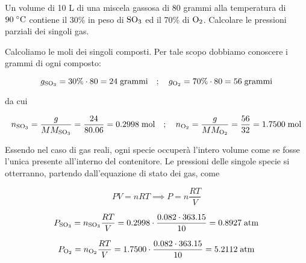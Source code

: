 \begin{esercizio}
    Un volume di 10 L di una miscela gassosa di 80 grammi alla temperatura di $90 \; ^{\circ} \rm C$ contiene il 30\% in peso di $\rm SO_3$ ed il 70\% di $\rm O_2$. Calcolare le pressioni parziali dei singoli gas.
\end{esercizio}
\begin{soluzione}
    Calcoliamo le moli dei singoli composti. Per tale scopo dobbiamo conoscere i grammi di ogni composto:

$$g_{\rm SO_3}=30\% \cdot 80=24 \; \text{grammi}
\quad;\quad
g_{\rm O_2}=70\% \cdot 80=56 \; \text{grammi}$$

da cui

\vspace{-0.2cm}$$n_{\rm SO_3}=\frac{g}{MM_{\rm SO_3}}=\frac{24}{80.06}=0.2998 \; \text{mol}
\quad;\quad
n_{\rm O_2}=\frac{g}{MM_{\rm O_2}}=\frac{56}{32}=1.7500 \; \text{mol}$$

Essendo nel caso di gas reali, ogni specie occuperà l'intero volume come se fosse l'unica presente all'interno del contenitore. Le pressioni delle singole specie si otterranno, partendo dall'equazione di stato dei gas, come

$$PV=nRT \implies
P=n\frac{RT}{V}$$

$$P_{\rm SO_3}=n_{\rm SO_3} \displaystyle \frac{RT}{V}
=0.2998 \cdot \frac{0.082 \cdot 363.15}{10}
=0.8927 \; \rm atm$$

$$P_{\rm O_2}=n_{\rm O_2} \displaystyle \frac{RT}{V}
=1.7500 \cdot \frac{0.082 \cdot 363.15}{10}
=5.2112 \; \rm atm$$
\end{soluzione}

\newpage

